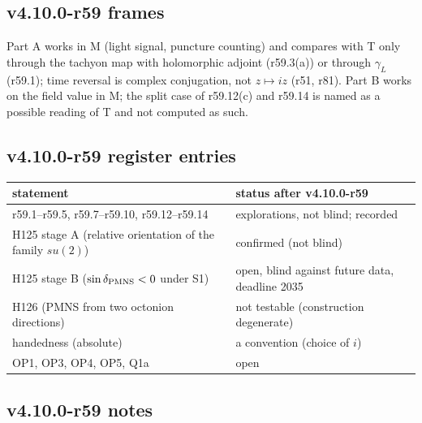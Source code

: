 \subsection*{v4.10.0-r59 frames}
\label{subsec:v4100-r59-frames}

Part A works in M (light signal, puncture counting) and compares with T only through the tachyon map with holomorphic adjoint (r59.3(a)) or
through \(\gamma_L\) (r59.1); time reversal is complex conjugation, not \(z\mapsto iz\) (r51, r81).  Part B works on the field value in M; the
split case of r59.12(c) and r59.14 is named as a possible reading of T and not computed as such.

\subsection*{v4.10.0-r59 register entries}
\label{subsec:v4100-r59-register}

\begin{center}
\small
\begin{tabular}{@{}>{\raggedright\arraybackslash}p{}>{\raggedright\arraybackslash}p{}@{}}
\toprule
statement & status after v4.10.0-r59\\
\midrule
r59.1--r59.5, r59.7--r59.10, r59.12--r59.14 & explorations, not blind; recorded\\
H125 stage A (relative orientation of the family \(su(2)\)) & confirmed (not blind)\\
H125 stage B (\(\sin\delta_{\rm PMNS}<0\) under S1) & open, blind against future data, deadline 2035\\
H126 (PMNS from two octonion directions) & not testable (construction degenerate)\\
handedness (absolute) & a convention (choice of \(i\))\\
OP1, OP3, OP4, OP5, Q1a & open\\
\bottomrule
\end{tabular}
\end{center}

\subsection*{v4.10.0-r59 notes}
\label{subsec:v4100-r59-notes}

